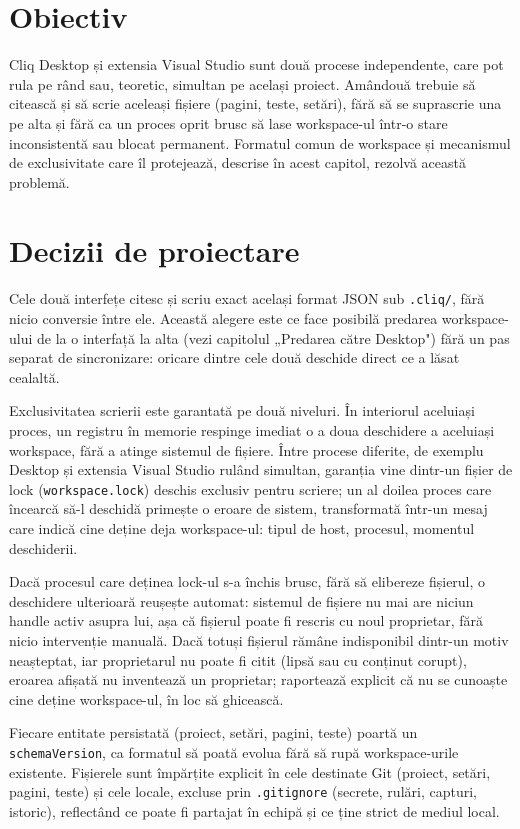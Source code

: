 \documentclass[12pt,a4paper]{report}
\newcommand{\File}[1]{\nolinkurl{#1}}
\begin{document}
\section{Obiectiv}

Cliq Desktop și extensia Visual Studio sunt două procese independente, care pot rula pe rând sau, teoretic, simultan pe același proiect. Amândouă trebuie să citească și să scrie aceleași fișiere (pagini, teste, setări), fără să se suprascrie una pe alta și fără ca un proces oprit brusc să lase workspace-ul într-o stare inconsistentă sau blocat permanent. Formatul comun de workspace și mecanismul de exclusivitate care îl protejează, descrise în acest capitol, rezolvă această problemă.

\section{Decizii de proiectare}

Cele două interfețe citesc și scriu exact același format JSON sub \File{.cliq/}, fără nicio conversie între ele. Această alegere este ce face posibilă predarea workspace-ului de la o interfață la alta (vezi capitolul „Predarea către Desktop") fără un pas separat de sincronizare: oricare dintre cele două deschide direct ce a lăsat cealaltă.

Exclusivitatea scrierii este garantată pe două niveluri. În interiorul aceluiași proces, un registru în memorie respinge imediat o a doua deschidere a aceluiași workspace, fără a atinge sistemul de fișiere. Între procese diferite, de exemplu Desktop și extensia Visual Studio rulând simultan, garanția vine dintr-un fișier de lock (\File{workspace.lock}) deschis exclusiv pentru scriere; un al doilea proces care încearcă să-l deschidă primește o eroare de sistem, transformată într-un mesaj care indică cine deține deja workspace-ul: tipul de host, procesul, momentul deschiderii.

Dacă procesul care deținea lock-ul s-a închis brusc, fără să elibereze fișierul, o deschidere ulterioară reușește automat: sistemul de fișiere nu mai are niciun handle activ asupra lui, așa că fișierul poate fi rescris cu noul proprietar, fără nicio intervenție manuală. Dacă totuși fișierul rămâne indisponibil dintr-un motiv neașteptat, iar proprietarul nu poate fi citit (lipsă sau cu conținut corupt), eroarea afișată nu inventează un proprietar; raportează explicit că nu se cunoaște cine deține workspace-ul, în loc să ghicească.

Fiecare entitate persistată (proiect, setări, pagini, teste) poartă un \File{schemaVersion}, ca formatul să poată evolua fără să rupă workspace-urile existente. Fișierele sunt împărțite explicit în cele destinate Git (proiect, setări, pagini, teste) și cele locale, excluse prin \File{.gitignore} (secrete, rulări, capturi, istoric), reflectând ce poate fi partajat în echipă și ce ține strict de mediul local.
\end{document}
